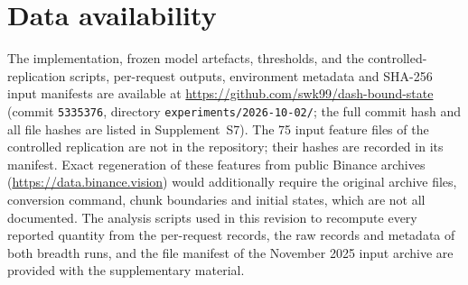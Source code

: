 \documentclass[a4paper,fleqn]{cas-dc}
\begin{document}
\section*{Data availability}
The implementation, frozen model artefacts, thresholds, and the controlled-replication scripts, per-request outputs, environment metadata and SHA-256 input manifests are available at \url{https://github.com/swk99/dash-bound-state} (commit \texttt{5335376}, directory \texttt{experiments/2026-10-02/}; the full commit hash and all file hashes are listed in Supplement~S7). The 75 input feature files of the controlled replication are not in the repository; their hashes are recorded in its manifest. Exact regeneration of these features from public Binance archives (\url{https://data.binance.vision}) would additionally require the original archive files, conversion command, chunk boundaries and initial states, which are not all documented. The analysis scripts used in this revision to recompute every reported quantity from the per-request records, the raw records and metadata of both breadth runs, and the file manifest of the November 2025 input archive are provided with the supplementary material.



\end{document}
